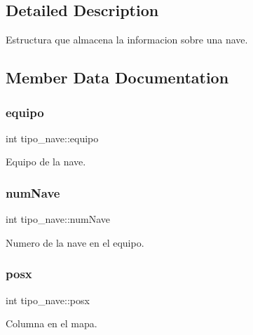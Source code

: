 \subsection{Detailed Description}
Estructura que almacena la informacion sobre una nave. 

\subsection{Member Data Documentation}
\mbox{\label{structtipo__nave_a9cef996f47c2096f5ee3752c26adde97}} 
\subsubsection{\texorpdfstring{equipo}{equipo}}
{\footnotesize\ttfamily int tipo\+\_\+nave\+::equipo}



Equipo de la nave. 

\mbox{\label{structtipo__nave_a0184bdd515add385641c157beee1064c}} 
\subsubsection{\texorpdfstring{num\+Nave}{numNave}}
{\footnotesize\ttfamily int tipo\+\_\+nave\+::num\+Nave}



Numero de la nave en el equipo. 

\mbox{\label{structtipo__nave_a51b86c3dbe20a9fe15170f3660991fa4}} 
\subsubsection{\texorpdfstring{posx}{posx}}
{\footnotesize\ttfamily int tipo\+\_\+nave\+::posx}



Columna en el mapa. 

\mbox{\label{structtipo__nave_aecc547543a942bf2ae99356141bb436a}} 
